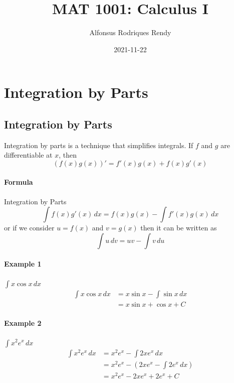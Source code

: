 \documentclass[12pt]{article}
\title{MAT 1001: Calculus I}
\author{Alfonsus Rodriques Rendy}
\date{2021-11-22}
\begin{document}
\begin{center}
    \hspace*{-0.5cm}
\end{center}

\section{Integration by Parts}
\subsection{Integration by Parts}
Integration by parts is a technique that simplifies integrals. If $f$ and $g$ are differentiable at $x$, then 
\[
    (f(x)g(x))' = f'(x)g(x) + f(x)g'(x)
\]
\paragraph{Formula} Integration by Parts
\[
    \int f(x)g'(x) \, dx = f(x)g(x) - \int f'(x)g(x) \, dx
\]
or if we consider $u = f(x)$ and $v = g(x)$ then it can be written as
\[
    \int u\, dv = uv - \int v \, du
\]

\paragraph{Example 1} $\int x \cos x \, dx$
\begin{align*} 
    \int x \cos x \, dx &= x \sin x - \int \sin x \, dx \\
    &= x \sin x + \cos x + C
\end{align*}

\paragraph{Example 2} $\int x^2 e^x \, dx$
\begin{align*} 
    \int x^2 e^x \, dx &= x^2 e^x - \int 2x e^x \, dx \\
    &= x^2 e^x - (2x e^x - \int 2 e^x \, dx) \\
    &= x^2 e^x - 2xe^x + 2e^x + C
\end{align*}
\end{document}
